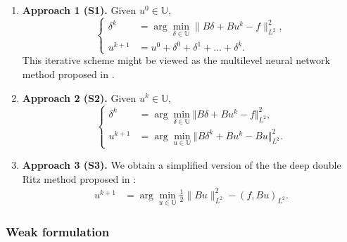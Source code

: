 \documentclass{article}
\theoremstyle{definition}
\begin{document}
    \begin{enumerate}
        \item[] \textbf{Approach 1 (S1).} Given $u^0\in\mathbb{U}$,\begin{equation}
    \left\{
    \begin{aligned}
        \delta^{k} &= \arg\min_{\delta \in \mathbb{U}} \| B\delta + Bu^k - f \|_{L^2}^2, \\[2ex]
        u^{k+1}    &= u^0 + \delta^0 + \delta^1 + \ldots + \delta^k.
    \end{aligned}
    \right.
    \label{eq:UzawaPINNs_ap1}
\end{equation}
This iterative scheme might be viewed as the multilevel neural network method proposed in \cite{aldirany2024multi}.
\item[] \textbf{Approach 2 (S2).} Given $u^k\in\mathbb U$,\begin{equation}
    \left\{
    \begin{aligned}
        \delta^{k} &=  \displaystyle\arg\min_{\delta\in \mathbb{U}}\Vert B\delta + Bu^k - f\Vert_{L^2}^2,\\[2ex]
        u^{k+1} &= \displaystyle\arg\min_{u\in\mathbb{U}} \Vert B\delta^k + Bu^k - Bu\Vert_{L^2}^2.
\end{aligned}
    \right.
\end{equation}
         \item [] \textbf{Approach 3 (S3).} We obtain a simplified version of the the deep double Ritz method proposed in \cite{uriarte2023DoubleRitz}:
\begin{align}
         u^{k+1} &=  \displaystyle\arg\min_{u\in \mathbb{U}} \frac{1}{2} \|Bu\|^2_{L^2} - (f,Bu)_{L^2}.
\label{eq:Uzawa_continuous3}
\end{align}
\end{enumerate}

\subsubsection{Weak formulation}
\end{document}
